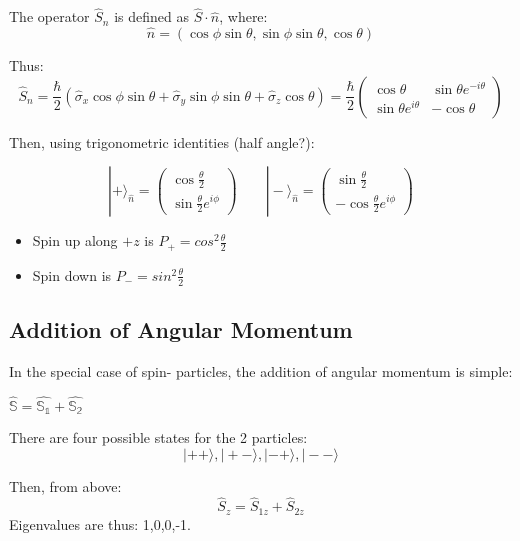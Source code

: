 \documentclass[11pt]{article}
\begin{document}
The operator \(\hat{S}_n\) is defined as \(\hat{S}\cdot\hat{n}\), where:
\[ \hat{n} = (\cos\phi\sin\theta, \sin\phi\sin\theta,\cos\theta) \]

Thus: 
\begin{equation*} \hat{S}_n = \frac{\hbar}{2}(\hat{\sigma}_x
\cos{\phi}\sin{\theta}+\hat{\sigma}_y\sin{\phi}\sin{\theta}+\hat{\sigma}_z\cos{\theta})
= \frac{\hbar}{2}
\begin{pmatrix}
\cos\theta & \sin\theta e^{-i\theta} \\
\sin\theta e^{i\theta} & -\cos\theta
\end{pmatrix} 
\end{equation*}

Then, using trigonometric identities (half angle?):

\begin{equation*}
|+\rangle_\hat{n} = 
\begin{pmatrix}
\cos{\frac{\theta}{2}}\\
\sin{\frac{\theta}{2}}e^{i\phi}
\end{pmatrix} \qquad

|-\rangle_\hat{n} = 
\begin{pmatrix}
\sin{\frac{\theta}{2}}\\
-\cos{\frac{\theta}{2}}e^{i\phi}
\end{pmatrix}


\end{equation*}


\begin{itemize}
\item Spin up along \(+z\) is \(P_+ = cos^2{\frac\theta2}\)
\item Spin down is \(P_- = sin^2{\frac\theta2}\)
\end{itemize}



\subsection{Addition of Angular Momentum}
\label{sec:orgf726f1f}

In the special case of spin-\textonehalf{} particles, the addition of angular
momentum is simple:

\(\hat{\mathbb{S}} = \hat{\mathbb{S_1}} + \hat{\mathbb{S_2}}\)

There are four possible states for the 2 particles:
\[ |++\rangle, |+-\rangle, |-+\rangle, |--\rangle\]

Then, from above:
\[ \hat{S}_z = \hat{S}_{1z} + \hat{S}_{2z}\]
Eigenvalues are thus: 1,0,0,-1.
\end{document}
